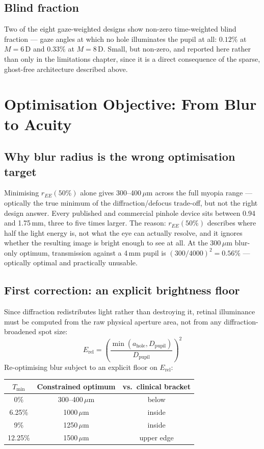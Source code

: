 \documentclass[11pt]{report}
\begin{document}
\section{Blind fraction}

Two of the eight gaze-weighted designs show non-zero time-weighted blind fraction --- gaze
angles at which no hole illuminates the pupil at all: $0.12\%$ at $M=6$\,D and $0.33\%$ at
$M=8$\,D. Small, but non-zero, and reported here rather than only in the limitations
chapter, since it is a direct consequence of the sparse, ghost-free architecture described
above.

\chapter{Optimisation Objective: From Blur to Acuity}

\section{Why blur radius is the wrong optimisation target}

Minimising $r_{EE}(50\%)$ alone gives 300--400\,$\mu$m across the full myopia range ---
optically the true minimum of the diffraction/defocus trade-off, but not the right design
answer. Every published and commercial pinhole device sits between 0.94 and 1.75\,mm, three
to five times larger. The reason: $r_{EE}(50\%)$ describes where half the light energy is,
not what the eye can actually resolve, and it ignores whether the resulting image is bright
enough to see at all. At the 300\,$\mu$m blur-only optimum, transmission against a 4\,mm
pupil is $(300/4000)^2 = 0.56\%$ --- optically optimal and practically unusable.

\section{First correction: an explicit brightness floor}

Since diffraction redistributes light rather than destroying it, retinal illuminance must
be computed from the raw physical aperture area, not from any diffraction-broadened spot
size:
\begin{equation}
E_{\text{rel}} = \left(\frac{\min(a_{\text{hole}}, D_{\text{pupil}})}{D_{\text{pupil}}}\right)^2
\end{equation}
Re-optimising blur subject to an explicit floor on $E_{\text{rel}}$:

\begin{center}
\begin{tabular}{ccc}
\toprule
$T_{\min}$ & Constrained optimum & vs.\ clinical bracket \\
\midrule
0\% & 300--400\,$\mu$m & below \\
6.25\% & 1000\,$\mu$m & inside \\
9\% & 1250\,$\mu$m & inside \\
12.25\% & 1500\,$\mu$m & upper edge \\
\bottomrule
\end{tabular}
\end{center}
\end{document}
